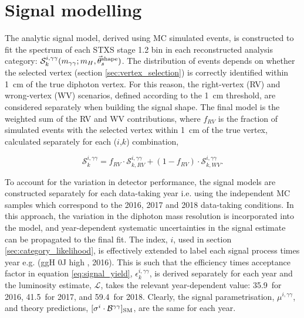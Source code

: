 \section{Signal modelling}\label{sec:sig_modelling}
The analytic signal model, derived using MC simulated events, is constructed to fit the \mgg spectrum of each STXS stage 1.2 bin in each reconstructed analysis category: $\mathcal{S}^{i,\gamma\gamma}_k(m_{\gamma\gamma};m_H,\vec{\theta}^{\rm{shape}}_s)$. The distribution of events depends on whether the selected vertex (section \ref{sec:vertex_selection}) is correctly identified within 1~cm of the true diphoton vertex. For this reason, the right-vertex (RV) and wrong-vertex (WV) scenarios, defined according to the 1~cm threshold, are considered separately when building the signal shape. The final model is the weighted sum of the RV and WV contributions, where $f_{RV}$ is the fraction of simulated events with the selected vertex within 1~cm of the true vertex, calculated separately for each ($i$,$k$) combination,

\begin{equation}
    \mathcal{S}^{i,\gamma\gamma}_k = f_{RV} \cdot \mathcal{S}^{i,\gamma\gamma}_{k,RV} + (1-f_{RV}) \cdot\mathcal{S}^{i,\gamma\gamma}_{k,WV}.
\end{equation}

To account for the variation in detector performance, the signal models are constructed separately for each data-taking year i.e. using the independent MC samples which correspond to the 2016, 2017 and 2018 data-taking conditions. In this approach, the variation in the diphoton mass resolution is incorporated into the model, and year-dependent systematic uncertainties in the signal estimate can be propagated to the final fit. The index, $i$, used in section \ref{sec:category_likelihood}, is effectively extended to label each signal process times year e.g. (ggH 0J high \ptH, 2016). This is such that the efficiency times acceptance factor in equation \ref{eq:signal_yield}, $\epsilon_k^{i,\gamma\gamma}$, is derived separately for each year and the luminosity estimate, $\mathcal{L}$, takes the relevant year-dependent value: 35.9~\fbinv for 2016, 41.5~\fbinv for 2017, and 59.4~\fbinv for 2018. Clearly, the signal parametrisation, $\mu^{i,\gamma\gamma}$, and theory predictions, $[\sigma^i \cdot \mathcal{B}^{\gamma\gamma}]_{\rm{SM}}$, are the same for each year.

